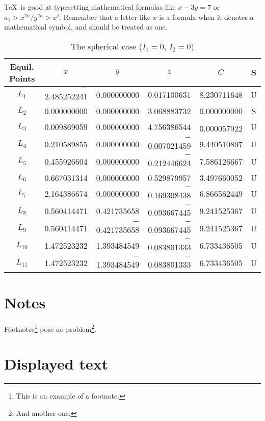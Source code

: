 \documentclass[pamq,keywordsasfootnote]{ipart}
\begin{document}
\TeX\ is good at typesetting mathematical formulas like
       \( x-3y = 7 \)
or
       \( a_{1} > x^{2n} / y^{2n} > x' \).
Remember that a letter like       $x$
is a formula when it denotes a mathematical symbol, and should
be treated as one.

\begin{table*}
\caption{The spherical case ($I_1=0$, $I_2=0$)}\label{sphericcase}
\begin{tabular*}{\textwidth}{@{\extracolsep{\fill}}crrrrc}
\hline
\hline
 Equil. Points & \multicolumn{1}{c}{$x$} & \multicolumn{1}{c}{$y$} & \multicolumn{1}{c}{$z$} & \multicolumn{1}{c}{$C$} &
S \\
\hline
$L_1$ & $-$2.485252241 & 0.000000000 & 0.017100631 & 8.230711648 & U \\
$L_2$ &    0.000000000 & 0.000000000 & 3.068883732 & 0.000000000 & S \\
$L_3$ &    0.009869059 & 0.000000000 & 4.756386544 & $-$0.000057922 & U \\
$L_4$ &    0.210589855 & 0.000000000 & $-$0.007021459 & 9.440510897 & U \\
$L_5$ &    0.455926604 & 0.000000000 & $-$0.212446624 & 7.586126667 & U \\
$L_6$ &    0.667031314 & 0.000000000 & 0.529879957 & 3.497660052 & U \\
$L_7$ &    2.164386674 & 0.000000000 & $-$0.169308438 & 6.866562449 & U \\
$L_8$ &    0.560414471 & 0.421735658 & $-$0.093667445 & 9.241525367 & U \\
$L_9$ &    0.560414471 & $-$0.421735658 & $-$0.093667445 & 9.241525367 & U\\
$L_{10}$ & 1.472523232 & 1.393484549 & $-$0.083801333 & 6.733436505 & U \\
$L_{11}$ & 1.472523232 & $-$1.393484549 & $-$0.083801333 & 6.733436505 & U
\\ \hline
\end{tabular*}
\end{table*}


\section{Notes}
Footnotes\footnote{This is an example of a footnote.}
pose no problem\footnote{And another one.}.

\section{Displayed text}
\end{document}
